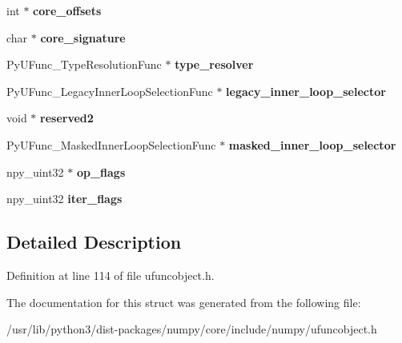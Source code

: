 \begin{DoxyCompactItemize}
\item 
int $\ast$ {\bfseries core\+\_\+offsets}\hypertarget{struct__tagPyUFuncObject_a888959e075475b44661c4d94efbf9d0e}{}\label{struct__tagPyUFuncObject_a888959e075475b44661c4d94efbf9d0e}

\item 
char $\ast$ {\bfseries core\+\_\+signature}\hypertarget{struct__tagPyUFuncObject_a309c6152b64e0b42fa6f632f58e27176}{}\label{struct__tagPyUFuncObject_a309c6152b64e0b42fa6f632f58e27176}

\item 
Py\+U\+Func\+\_\+\+Type\+Resolution\+Func $\ast$ {\bfseries type\+\_\+resolver}\hypertarget{struct__tagPyUFuncObject_ae42da94c32a6919a0b35ec78b4598c9d}{}\label{struct__tagPyUFuncObject_ae42da94c32a6919a0b35ec78b4598c9d}

\item 
Py\+U\+Func\+\_\+\+Legacy\+Inner\+Loop\+Selection\+Func $\ast$ {\bfseries legacy\+\_\+inner\+\_\+loop\+\_\+selector}\hypertarget{struct__tagPyUFuncObject_a107a3b5b099e2d2e72922950bf342f58}{}\label{struct__tagPyUFuncObject_a107a3b5b099e2d2e72922950bf342f58}

\item 
void $\ast$ {\bfseries reserved2}\hypertarget{struct__tagPyUFuncObject_af4f333d48330f0039e9941a0878731a1}{}\label{struct__tagPyUFuncObject_af4f333d48330f0039e9941a0878731a1}

\item 
Py\+U\+Func\+\_\+\+Masked\+Inner\+Loop\+Selection\+Func $\ast$ {\bfseries masked\+\_\+inner\+\_\+loop\+\_\+selector}\hypertarget{struct__tagPyUFuncObject_a43e3cfddb27535ff4ad63e14989f9cf1}{}\label{struct__tagPyUFuncObject_a43e3cfddb27535ff4ad63e14989f9cf1}

\item 
npy\+\_\+uint32 $\ast$ {\bfseries op\+\_\+flags}\hypertarget{struct__tagPyUFuncObject_a82fb82c58c68f92dcb85daa7ff5a8838}{}\label{struct__tagPyUFuncObject_a82fb82c58c68f92dcb85daa7ff5a8838}

\item 
npy\+\_\+uint32 {\bfseries iter\+\_\+flags}\hypertarget{struct__tagPyUFuncObject_ad1a2e939a99c518934fe8f769e109a2e}{}\label{struct__tagPyUFuncObject_ad1a2e939a99c518934fe8f769e109a2e}

\end{DoxyCompactItemize}


\subsection{Detailed Description}


Definition at line 114 of file ufuncobject.\+h.



The documentation for this struct was generated from the following file\+:\begin{DoxyCompactItemize}
\item 
/usr/lib/python3/dist-\/packages/numpy/core/include/numpy/ufuncobject.\+h\end{DoxyCompactItemize}
